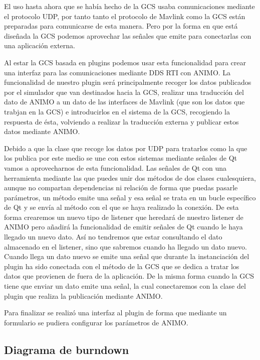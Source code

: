 \documentclass[12pt,a4paper,spanish]{book} %
\begin{document}
El uso hasta ahora que se había hecho de la GCS usaba comunicaciones mediante el protocolo UDP, por tanto tanto el protocolo de Mavlink como la GCS están preparadas para comunicarse de esta manera. Pero por la forma en que está diseñada la GCS podemos aprovechar las señales que emite para conectarlas con una aplicación externa.

Al estar la GCS basada en plugins podemos usar esta funcionalidad para crear una interfaz para las comunicaciones mediante DDS RTI con ANIMO. La funcionalidad de nuestro plugin será principalmente recoger los datos publicados por el simulador que van destinados hacia la GCS, realizar una traducción del dato de ANIMO a un dato de las interfaces de Mavlink (que son los datos que trabjan en la GCS) e introducirlos en el sistema de la GCS, recogiendo la respuesta de ésta, volviendo a realizar la traducción externa y publicar estos datos mediante ANIMO.

Debido a que la clase que recoge los datos por UDP para tratarlos como la que los publica por este medio se une con estos sistemas mediante señales de Qt vamos a aprovecharnos de esta funcionalidad. Las señales de Qt con una herramienta mediante las que puedes unir dos métodos de dos clases cualesquiera, aunque no compartan dependencias ni relación de forma que puedas pasarle parámetros, un método emite una señal y esa señal se trata en un bucle específico de Qt y se envía al método con el que se haya realizado la conexión. De esta forma crearemos un nuevo tipo de listener que heredará de nuestro listener de ANIMO pero añadirá la funcionalidad de emitir señales de Qt cuando le haya llegado un nuevo dato. Así no tendremos que estar consultando el dato almacenado en el listener, sino que sabremos cuando ha llegado un dato nuevo. Cuando llega un dato nuevo se emite una señal que durante la instanciación del plugin ha sido conectada con el método de la GCS que se dedica a tratar los datos que provienen de fuera de la aplicación. De la misma forma cuando la GCS tiene que enviar un dato emite una señal, la cual conectaremos con la clase del plugin que realiza la publicación mediante ANIMO.

Para finalizar se realizó una interfaz al plugin de forma que mediante un formulario se pudiera configurar los parámetros de ANIMO.

\subsection{Diagrama de burndown}
\end{document}
